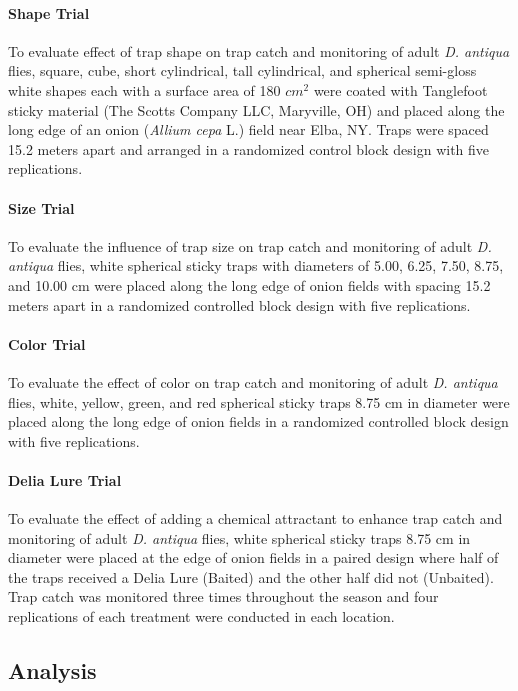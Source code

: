 \documentclass[alpha-refs]{wiley-article}
\begin{document}
\paragraph{Shape Trial} To evaluate effect of trap shape on trap catch and monitoring of adult \textit{D. antiqua} flies, square, cube, short cylindrical, tall cylindrical, and spherical semi-gloss white shapes each with a surface area of 180 $cm^2$  were coated with Tanglefoot sticky material (The Scotts Company LLC, Maryville, OH) and placed along the long edge of an onion (\textit{Allium cepa} L.) field near Elba, NY. Traps were spaced 15.2 meters apart and arranged in a randomized control block design with five replications.   

\paragraph{Size Trial}
To evaluate the influence of trap size on trap catch and monitoring of adult \textit{D. antiqua} flies, white spherical sticky traps with diameters of 5.00, 6.25, 7.50, 8.75, and 10.00 cm were placed along the long edge of onion fields with spacing 15.2 meters apart in a randomized controlled block design with five replications.  

\paragraph{Color Trial}
To evaluate the effect of color on trap catch and monitoring of adult \textit{D. antiqua} flies, white, yellow, green, and red spherical sticky traps 8.75 cm in diameter were placed along the long edge of onion fields in a randomized controlled block design with five replications.  

\paragraph{Delia Lure Trial}
To evaluate the effect of adding a chemical attractant to enhance trap catch and monitoring of adult \textit{D. antiqua} flies, white spherical sticky traps 8.75 cm in diameter were placed at the edge of onion fields in a paired design where half of the traps received a Delia Lure (Baited) and the other half did not (Unbaited). Trap catch was monitored three times throughout the season and four replications of each treatment were conducted in each location.  


\subsection{Analysis}
\end{document}
